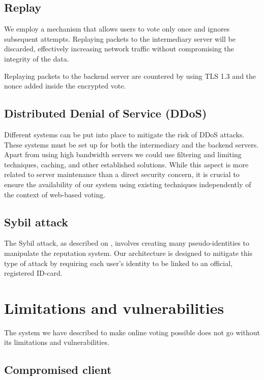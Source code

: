 \documentclass[a4paper,12pt,english]{article}
\begin{document}
\subsection{Replay}\label{sec:attack-replay}

We employ a mechanism that allows users to vote only once and ignores subsequent attempts. Replaying packets to the intermediary server will be discarded, effectively increasing network traffic without compromising the integrity of the data.

Replaying packets to the backend server are countered by using TLS 1.3 and the nonce added inside the encrypted vote.

\subsection{Distributed Denial of Service (DDoS)}\label{sec:attack-ddos}

Different systems can be put into place to mitigate the risk of DDoS attacks. These systems must be set up for both the intermediary and the backend servers. Apart from using high bandwidth servers we could use filtering and limiting techniques, caching, and other established solutions. While this aspect is more related to server maintenance than a direct security concern, it is crucial to ensure the availability of our system using existing techniques independently of the context of web-based voting.

\subsection{Sybil attack}\label{sec:attack-sybil}

The Sybil attack, as described on \cite{wikipedia-contributors-2023}, involves creating many pseudo-identities to manipulate the reputation system. Our architecture is designed to mitigate this type of attack by requiring each user's identity to be linked to an official, registered ID-card.

\section{Limitations and vulnerabilities}\label{sec:limitations}

The system we have described to make online voting possible does not go without its limitations and vulnerabilities.

\subsection{Compromised client}\label{sec:limit-client}
\end{document}
